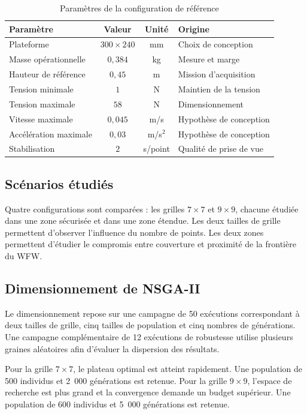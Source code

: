 \begin{table}[H]
\centering
\caption{Paramètres de la configuration de référence}
\label{tab:parametres_reference_nouveau}
\footnotesize
\begin{tabular}{|p{5.0cm}|c|c|p{5.0cm}|}
\hline
\textbf{Paramètre} & \textbf{Valeur} & \textbf{Unité} & \textbf{Origine} \\
\hline
Plateforme & $300\times240$ & mm & Choix de conception \\
\hline
Masse opérationnelle & $0{,}384$ & kg & Mesure et marge \\
\hline
Hauteur de référence & $0{,}45$ & m & Mission d'acquisition \\
\hline
Tension minimale & $1$ & N & Maintien de la tension \\
\hline
Tension maximale & $58$ & N & Dimensionnement \\
\hline
Vitesse maximale & $0{,}045$ & m/s & Hypothèse de conception \\
\hline
Accélération maximale & $0{,}03$ & m/s$^2$ & Hypothèse de conception \\
\hline
Stabilisation & $2$ & s/point & Qualité de prise de vue \\
\hline
\end{tabular}
\end{table}

\subsection{Scénarios étudiés}

Quatre configurations sont comparées : les grilles $7\times7$ et $9\times9$, chacune étudiée dans une zone sécurisée et dans une zone étendue. Les deux tailles de grille permettent d'observer l'influence du nombre de points. Les deux zones permettent d'étudier le compromis entre couverture et proximité de la frontière du WFW.

\subsection{Dimensionnement de NSGA-II}

Le dimensionnement repose sur une campagne de 50 exécutions correspondant à deux tailles de grille, cinq tailles de population et cinq nombres de générations. Une campagne complémentaire de 12 exécutions de robustesse utilise plusieurs graines aléatoires afin d'évaluer la dispersion des résultats.

Pour la grille $7\times7$, le plateau optimal est atteint rapidement. Une population de 500 individus et 2~000 générations est retenue. Pour la grille $9\times9$, l'espace de recherche est plus grand et la convergence demande un budget supérieur. Une population de 600 individus et 5~000 générations est retenue.

